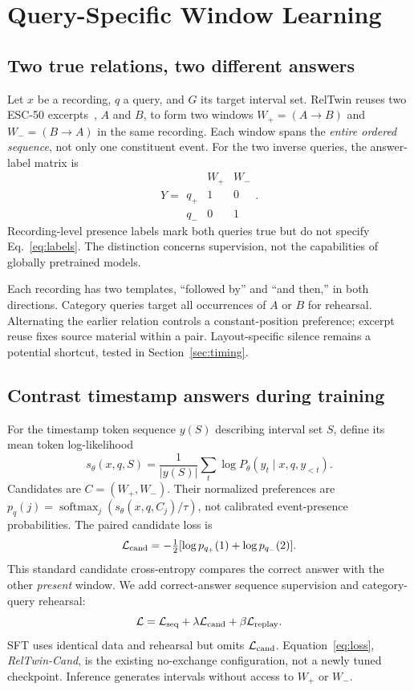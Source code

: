 \section{Query-Specific Window Learning}
\subsection{Two true relations, two different answers}
Let $x$ be a recording, $q$ a query, and $G$ its target interval set. RelTwin reuses two ESC-50 excerpts~\cite{piczak2015esc}, $A$ and $B$, to form two windows $W_+=(A\!\rightarrow\!B)$ and $W_-=(B\!\rightarrow\!A)$ in the same recording. Each window spans the \emph{entire ordered sequence}, not only one constituent event. For the two inverse queries, the answer-label matrix is
\begin{equation}
Y=\begin{array}{c|cc}
 &W_+&W_-\\ \hline
q_+&1&0\\
q_-&0&1
\end{array}.
\label{eq:labels}
\end{equation}
Recording-level presence labels mark both queries true but do not specify Eq.~\ref{eq:labels}. The distinction concerns supervision, not the capabilities of globally pretrained models.

Each recording has two templates, ``followed by'' and ``and then,'' in both directions. Category queries target all occurrences of $A$ or $B$ for rehearsal. Alternating the earlier relation controls a constant-position preference; excerpt reuse fixes source material within a pair. Layout-specific silence remains a potential shortcut, tested in Section~\ref{sec:timing}.

\subsection{Contrast timestamp answers during training}
For the timestamp token sequence $y(S)$ describing interval set $S$, define its mean token log-likelihood
\begin{equation}
s_\theta(x,q,S)=\frac{1}{|y(S)|}\sum_t\log P_\theta(y_t\mid x,q,y_{<t}).
\end{equation}
Candidates are $C=(W_+,W_-)$. Their normalized preferences are $p_q(j)=\operatorname{softmax}_j(s_\theta(x,q,C_j)/\tau)$, not calibrated event-presence probabilities. The paired candidate loss is
\begin{equation}
\mathcal L_{\rm cand}=-\tfrac12[\log p_{q_+}(1)+\log p_{q_-}(2)].
\label{eq:candidate}
\end{equation}
This standard candidate cross-entropy compares the correct answer with the other \emph{present} window. We add correct-answer sequence supervision and category-query rehearsal:
\begin{equation}
\mathcal L=\mathcal L_{\rm seq}+\lambda\mathcal L_{\rm cand}
+\beta\mathcal L_{\rm replay}.
\label{eq:loss}
\end{equation}
SFT uses identical data and rehearsal but omits $\mathcal L_{\rm cand}$. Equation~\ref{eq:loss}, \emph{RelTwin-Cand}, is the existing no-exchange configuration, not a newly tuned checkpoint. Inference generates intervals without access to $W_+$ or $W_-$.

